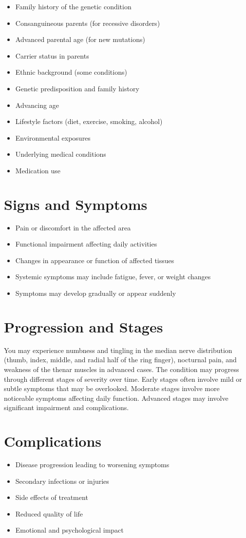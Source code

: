 \begin{itemize}[noitemsep]
  \item Family history of the genetic condition
  \item Consanguineous parents (for recessive disorders)
  \item Advanced parental age (for new mutations)
  \item Carrier status in parents
  \item Ethnic background (some conditions)
  \item Genetic predisposition and family history
  \item Advancing age
  \item Lifestyle factors (diet, exercise, smoking, alcohol)
  \item Environmental exposures
  \item Underlying medical conditions
  \item Medication use
\end{itemize}
\section{Signs and Symptoms}
\begin{itemize}[noitemsep]
  \item Pain or discomfort in the affected area
  \item Functional impairment affecting daily activities
  \item Changes in appearance or function of affected tissues
  \item Systemic symptoms may include fatigue, fever, or weight changes
  \item Symptoms may develop gradually or appear suddenly
\end{itemize}
\section{Progression and Stages}
You may experience numbness and tingling in the median nerve distribution (thumb, index, middle, and radial half of the ring finger), nocturnal pain, and weakness of the thenar muscles in advanced cases. The condition may progress through different stages of severity over time. Early stages often involve mild or subtle symptoms that may be overlooked. Moderate stages involve more noticeable symptoms affecting daily function. Advanced stages may involve significant impairment and complications.
\section{Complications}
\begin{itemize}[noitemsep]
  \item Disease progression leading to worsening symptoms
  \item Secondary infections or injuries
  \item Side effects of treatment
  \item Reduced quality of life
  \item Emotional and psychological impact
\end{itemize}
